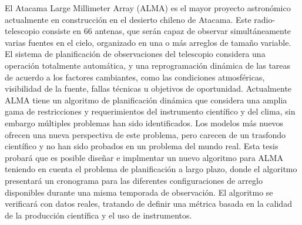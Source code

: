 El Atacama Large Millimeter Array (ALMA) es el mayor proyecto astron\'omico actualmente en
construcci\'on en el desierto chileno de Atacama. Este radio-telescopio consiste en 66
antenas, que ser\'an capaz de observar simult\'aneamente varias fuentes en el cielo, organizado en una o m\'as arreglos
de tama\~no variable. El sistema de planificaci\'on de observaciones del telescopio
considera una operaci\'on totalmente autom\'atica, y una reprogramaci\'on din\'amica de las tareas de
acuerdo a los factores cambiantes, como las condiciones atmosf\'ericas, visibilidad de la fuente,
fallas t\'ecnicas u objetivos de oportunidad.
Actualmente ALMA tiene un algoritmo de planificaci\'on din\'amica que considera una amplia
gama de restricciones y requerimientos del instrumento cient\'ifico y del clima, sin embargo
m\'ultiples problemas han sido identificados. Los modelos m\'as nuevos ofrecen una nueva
perspectiva de este problema, pero carecen de un trasfondo cient\'ifico y no han sido probados en
un problema del mundo real. Esta tesis probar\'a que es posible dise\~nar e implmentar un nuevo algoritmo para ALMA
teniendo en cuenta el problema de planificaci\'on a largo plazo, donde el algoritmo presentar\'a
un cronograma para las diferentes configuraciones de arreglo disponibles durante una misma
temporada de observaci\'on. El algoritmo se verificar\'a con datos reales, tratando de definir una
m\'etrica basada en la calidad de la producci\'on cient\'ifica y el uso de instrumentos.
\vfill

\cleardoublepage